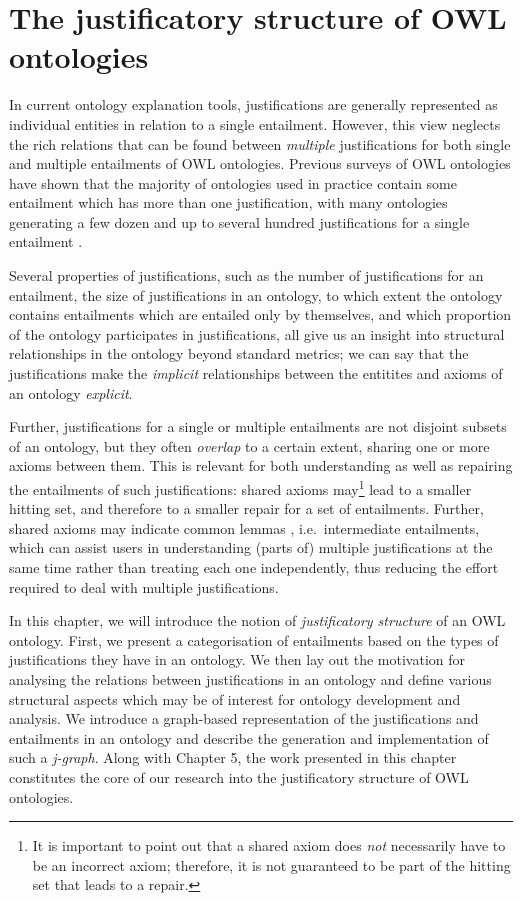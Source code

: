 \chapter{The justificatory structure of OWL ontologies}
\label{chap:structure}

In current ontology explanation tools, justifications are generally represented as individual entities in relation to a single entailment. However, this view neglects the rich relations that can be found between \emph{multiple} justifications for both single and multiple entailments of OWL ontologies. Previous surveys of OWL ontologies have shown that the majority of ontologies used in practice contain some entailment which has more than one justification, with many ontologies generating a few dozen and up to several hundred justifications for a single entailment \cite{bail10kb,horridge11ab,bail11jm}. 

Several properties of justifications, such as the number of justifications for an entailment, the size of justifications in an ontology, to which extent the ontology contains entailments which are entailed only by themselves, and which proportion of the ontology participates in justifications, all give us an insight into structural relationships in the ontology beyond standard metrics; we can say that the justifications make the \emph{implicit} relationships between the entitites and axioms of an ontology \emph{explicit}.

Further, justifications for a single or multiple entailments are not disjoint subsets of an ontology, but they often \emph{overlap} to a certain extent, sharing one or more axioms between them. This is relevant for both understanding as well as repairing the entailments of such justifications: shared axioms may\footnote{It is important to point out that a shared axiom does \emph{not} necessarily have to be an incorrect axiom; therefore, it is not guaranteed to be part of the hitting set that leads to a repair.} lead to a smaller hitting set, and therefore to a smaller repair for a set of entailments. Further, shared axioms may indicate common lemmas \cite{horridge09ct}, i.e.\ intermediate entailments, which can assist users in understanding (parts of) multiple justifications at the same time rather than treating each one independently, thus reducing the effort required to deal with multiple justifications.

In this chapter, we will introduce the notion of \emph{justificatory structure} of an OWL ontology. First, we present a categorisation of entailments based on the types of justifications they have in an ontology. We then lay out the motivation for analysing the relations between justifications in an ontology and define various structural aspects which may be of interest for ontology development and analysis. We introduce a graph-based representation of the justifications and entailments in an ontology and describe the generation and implementation of such a \emph{j-graph}. Along with Chapter 5, the work presented in this chapter constitutes the core of our research into the justificatory structure of OWL ontologies.


